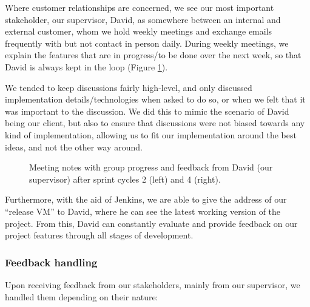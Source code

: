 ﻿\documentclass[a4paper, titlepage]{article}
\begin{document}
Where customer relationships are concerned, we see our most important stakeholder, our supervisor, David, as somewhere between an internal and external customer, whom we hold weekly meetings and exchange emails frequently with but not contact in person daily. During weekly meetings, we explain the features that are in progress/to be done over the next week, so that David is always kept in the loop (Figure \ref{fig:meetingboard}).

We tended to keep discussions fairly high-level, and only discussed implementation details/technologies when asked to do so, or when we felt that it was important to the discussion. We did this to mimic the scenario of David being our client, but also to ensure that discussions were not biased towards any kind of implementation, allowing us to fit our implementation around the best ideas, and not the other way around.

\begin{figure}[H]
  \begin{minipage}{0.49\textwidth}
  \end{minipage}
  \begin{minipage}{0.49\textwidth}
  \end{minipage}
  \caption{Meeting notes with group progress and feedback from David (our supervisor) after sprint cycles 2 (left) and 4 (right).}
  \label{fig:meetingboard}
\end{figure}

Furthermore, with the aid of Jenkins, we are able to give the address of our ``release VM'' to David, where he can see the latest working version of the project. From this, David can constantly evaluate and provide feedback on our project features through all stages of development.

\subsubsection{Feedback handling}

Upon receiving feedback from our stakeholders, mainly from our supervisor, we handled them depending on their nature:
\end{document}
